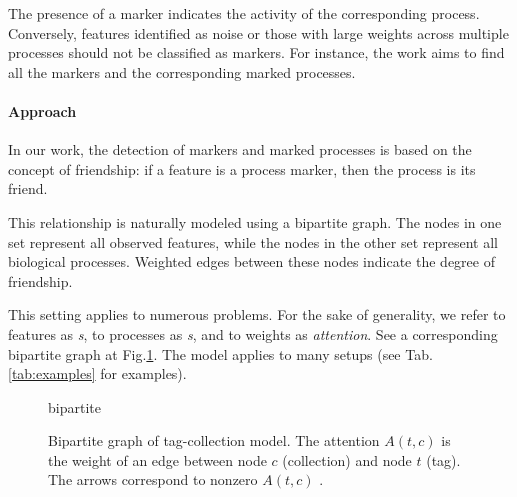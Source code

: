 \documentclass{llncs}
\begin{document}
The presence of a marker indicates the activity of the corresponding process. Conversely, features identified as noise or those with large weights across multiple processes should not be classified as markers. For instance, the work \cite{stein-obrien_patternmarkers_2017} aims to find all the markers and the corresponding marked processes. 

\paragraph{Approach} In our work, the detection of markers and marked processes is based on the concept of friendship: if a feature is a process marker, then the process is its friend.

This relationship is naturally modeled using a bipartite graph. The nodes in one set represent all observed features, while the nodes in the other set represent all biological processes. Weighted edges between these nodes indicate the degree of friendship.


This setting applies to numerous problems. For the sake of generality, we refer to features as \textit{{\tag}s}, to processes as \textit{{\collection}s}, and to weights as \textit{attention}. See a corresponding bipartite graph at Fig.\ref{fig:nice_name}. The model applies to many setups (see Tab.\ref{tab:examples} for examples). 
\begin{figure}
 \centering
 {bipartite}
 \caption{Bipartite graph of tag-collection model. The attention $A(t, c)$ is the weight of an edge between node $c$ (collection) and node $t$ (tag).
 The arrows correspond to nonzero $A(t,c)$ .}
 \label{fig:nice_name}
\end{figure}
\end{document}
